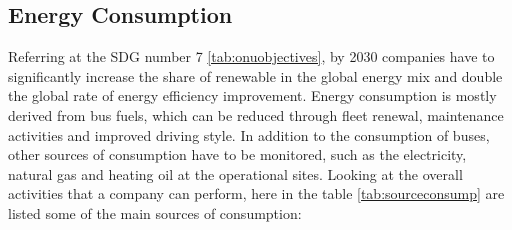 \subsection{Energy Consumption}
\label{subsec:enecons}
Referring at the SDG number 7 \ref{tab:onuobjectives}, by 2030 companies have to significantly increase the share of renewable in the global energy mix and double the global rate of energy efficiency improvement.
Energy consumption is mostly derived from bus fuels, which can be reduced through fleet renewal, maintenance activities and improved driving style. In addition to the consumption of buses, other sources of consumption have to be monitored, such as the electricity, natural gas and heating oil at the operational sites.
Looking at the overall activities that a company can perform, here in the table \ref{tab:sourceconsump} are listed some of the main sources of consumption:
